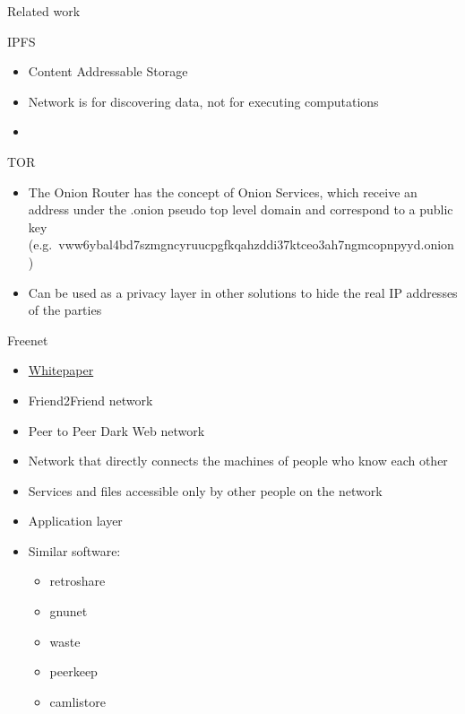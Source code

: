 \begin{frame}[fragile]{Related work}
\begin{block}{IPFS}
\protect\hypertarget{ipfs}{}
\begin{itemize}
\tightlist
\item
  Content Addressable Storage
\item
  Network is for discovering data, not for executing computations
\item
\end{itemize}
\end{block}

\begin{block}{TOR}
\protect\hypertarget{tor}{}
\begin{itemize}
\tightlist
\item
  The Onion Router has the concept of Onion Services, which receive an
  address under the .onion pseudo top level domain and correspond to a
  public key
  (e.g.~vww6ybal4bd7szmgncyruucpgfkqahzddi37ktceo3ah7ngmcopnpyyd.onion)
\item
  Can be used as a privacy layer in other solutions to hide the real IP
  addresses of the parties
\end{itemize}
\end{block}

\begin{block}{Freenet}
\protect\hypertarget{freenet}{}
\begin{itemize}
\tightlist
\item
  \href{https://homepage.divms.uiowa.edu/~ghosh/freenet.pdf}{Whitepaper}
\item
  Friend2Friend network
\item
  Peer to Peer Dark Web network
\item
  Network that directly connects the machines of people who know each
  other
\item
  Services and files accessible only by other people on the network
\item
  Application layer
\item
  Similar software:

  \begin{itemize}
  \tightlist
  \item
    retroshare
  \item
    gnunet
  \item
    waste
  \item
    peerkeep
  \item
    camlistore
  \end{itemize}
\end{itemize}
\end{block}


\end{frame}
